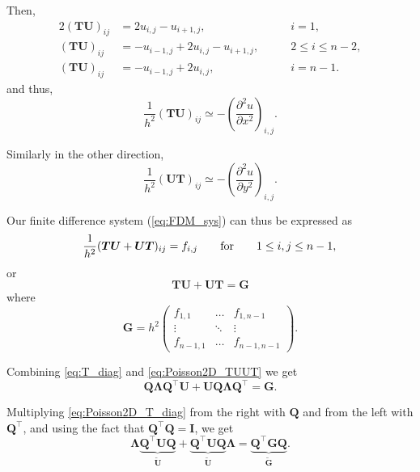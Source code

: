 Then,
\begin{alignat*}{2}
  (\bm T \bm U)_{ij} &= 2u_{i,j} - u_{i+1,j}, & \qquad i=1, \\
  (\bm T \bm U)_{ij} &= -u_{i-1,j}+2u_{i,j} - u_{i+1,j}, &\qquad 2 \leq i \leq n-2, \\
  (\bm T \bm U)_{ij} &= -u_{i-1,j}+2u_{i,j}, &\qquad i=n-1.
\end{alignat*}
and thus,
\begin{equation}
  \frac{1}{h^2} (\bm T \bm U)_{ij} \simeq
  - \left( \frac{\partial^2 u}{\partial x^2} \right)_{i,j}.
\end{equation}

Similarly in the other direction,
\begin{equation}
  \frac{1}{h^2} (\bm U \bm T)_{ij} \simeq
  - \left( \frac{\partial^2 u}{\partial y^2} \right)_{i,j}.
\end{equation}

Our finite difference system (\ref{eq:FDM_sys}) can thus be expressed as
\begin{equation*}
  \frac{1}{h^2} (\bm T \bm U + \bm U \bm T)_{ij} = f_{i,j}
  \qquad \text{for} \qquad 1 \leq i,j \leq n-1, \\
\end{equation*}
or
\begin{equation}
  \bm T \bm U + \bm U \bm T = \bm G
  \label{eq:Poisson2D_TUUT}
\end{equation}
where
\begin{equation*}
  \bm G = h^2
  \begin{pmatrix}
    f_{1,1} & \ldots & f_{1,n-1} \\
    \vdots & \ddots & \vdots \\
    f_{n-1,1} & \ldots & f_{n-1,n-1}
  \end{pmatrix}.
\end{equation*}

Combining \eqref{eq:T_diag} and \eqref{eq:Poisson2D_TUUT} we get
\begin{equation}
  \bm Q \bm \Lambda \bm Q^\intercal \bm U + \bm U \bm Q \bm \Lambda \bm Q^\intercal = \bm {G}.
  \label{eq:Poisson2D_T_diag}
\end{equation}

Multiplying \eqref{eq:Poisson2D_T_diag} from the right with $\bm Q$ and from the
left with $\bm Q^\intercal$, and using the fact that $\bm Q^\intercal \bm Q =
\bm I$, we get
\begin{equation*}
  \bm \Lambda \underbrace{\bm Q^\intercal \bm U \bm Q}_{\tilde{\bm U}} +
  \underbrace{\bm Q^\intercal \bm U \bm Q}_{\tilde{\bm U}} \bm \Lambda =
  \underbrace{\bm Q^\intercal \bm G \bm Q}_{\tilde{\bm G}}.
\end{equation*}

